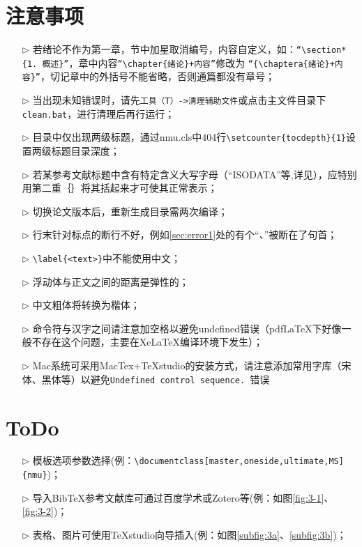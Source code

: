 \section{注意事项}
\begin{itemize}
  \item[$\triangleright$] 若绪论不作为第一章，节中加星取消编号，内容自定义，如：\verb|“\section*{1. 概述}”|，章中内容\verb|“\chapter{绪论}+内容”|修改为
  \verb|“{\chaptera{绪论}+内容}”|，切记章中的外括号不能省略，否则通篇都没有章号；
  \item[$\triangleright$] 当出现未知错误时，请先\verb|工具（T）->清理辅助文件|或点击主文件目录下\verb|clean.bat|，进行清理后再行运行；
  \item[$\triangleright$] 目录中仅出现两级标题，通过nmu.cls中404行\verb|\setcounter{tocdepth}{1}|设置两级标题目录深度；
  \item[$\triangleright$] 若某参考文献标题中含有特定含义大写字母（“ISODATA”等,详见\cite{Li2017An}），应特别用第二重｛｝将其括起来才可使其正常表示；
  \item[$\triangleright$] 切换论文版本后，重新生成目录需两次编译；
  \item[$\triangleright$] 行末针对标点的断行不好，例如\ref{sec:error1}处的有个“、”被断在了句首；
  \item[$\triangleright$] \verb|\label{<text>}|中不能使用中文；
  \item[$\triangleright$] 浮动体与正文之间的距离是弹性的；
  \item[$\triangleright$] 中文粗体将转换为楷体；
  \item[$\triangleright$] 命令符与汉字之间请注意加空格以避免undefined错误（pdfLaTeX下好像一般不存在这个问题，主要在XeLaTeX编译环境下发生）；
  \item[$\triangleright$] Mac系统可采用MacTex+TeXstudio的安装方式，请注意添加常用字库（宋体、黑体等）以避免\verb|Undefined control sequence. |错误
\end{itemize}

\section{ToDo}
\begin{itemize}
  \item[$\triangleright$] 模板选项参数选择(例：\verb|\documentclass[master,oneside,ultimate,MS]{nmu}|)；
  \item[$\triangleright$] 导入BibTeX参考文献库可通过百度学术或Zotero等(例：如图\ref{fig:3-1}、\ref{fig:3-2})；
  \item[$\triangleright$] 表格、图片可使用TeXstudio向导插入(例：如图\ref{subfig:3a}、\ref{subfig:3b})；

\end{itemize}


